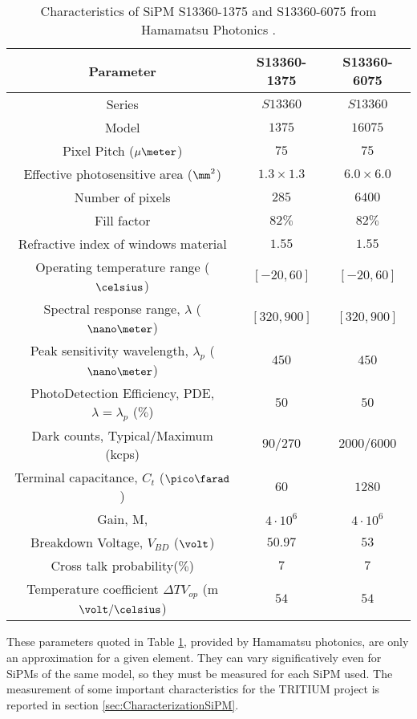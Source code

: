 \begin{table}[h]
\begin{center}
\begin{tabular}{|c|c|c|}
\hline
Parameter & S13360-1375 & S13360-6075 \\
\hline \hline \hline
Series & $S13360$ & $S13360$ \\ \hline
Model & $1375$ & $16075$ \\ \hline
Pixel Pitch ($\mu\meter$) & $75$ & $75$ \\ \hline
Effective photosensitive area ($\mm^2$) & $1.3 \times 1.3$ & $6.0 \times 6.0$ \\ \hline
Number of pixels & $285$ & $6400$ \\ \hline
Fill factor & $82\%$ & $82\%$ \\ \hline
Refractive index of windows material & $1.55$ & $1.55$ \\ \hline
Operating temperature range ($\celsius$) & $[-20,60]$ & $[-20,60]$ \\ \hline
Spectral response range, $\lambda$ ($\nano\meter$) & $[320, 900]$ & $[320, 900]$ \\ \hline
Peak sensitivity wavelength, $\lambda_p$ ($\nano\meter$) & $450$ & $450$ \\ \hline
PhotoDetection Efficiency, PDE, $\lambda=\lambda_p$ ($\%$) & $50$ & $50$ \\ \hline
Dark counts, Typical/Maximum (kcps) & $90/270$ & $2000/6000$ \\ \hline
Terminal capacitance, $C_t$ ($\pico\farad$) & $60$ & $1280$ \\ \hline
Gain, M, & $4 \cdot{} 10^6$ & $4 \cdot{} 10^6$ \\ \hline
Breakdown Voltage, $V_{BD}$ ($\volt$) & $50.97$ & $53$ \\ \hline
Cross talk probability($\%$) & $7$ & $7$ \\ \hline
Temperature coefficient $\Delta TV_{op}$ (m$\volt/\celsius$) & $54$ & $54$ \\ \hline
\end{tabular}
\caption{Characteristics of SiPM S13360-1375 and S13360-6075 from Hamamatsu Photonics \cite{DataSheetHammamatsu_1_SiPM_1375}.}
\label{tab:PropertiesOfSiPM1375}
\end{center}
\end{table}
These parameters quoted in Table \ref{tab:PropertiesOfSiPM1375}, provided by Hamamatsu photonics, are only an approximation for a given element. They can vary significatively even for SiPMs of the same model, so they must be measured for each SiPM used. The measurement of some important characteristics for the TRITIUM project is reported in section \ref{sec:CharacterizationSiPM}. 

